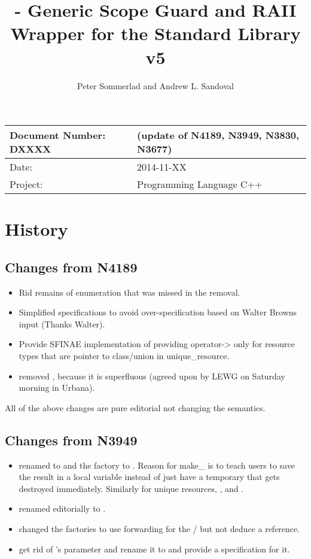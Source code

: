 \documentclass[ebook,11pt,article]{memoir}
\title{\NNumber - Generic Scope Guard and RAII Wrapper for the Standard Library v5}
\author{Peter Sommerlad and Andrew L. Sandoval}
\date{\DocDate}                                           %
\newcommand{\NNumber}[0]{DXXXX}
\newcommand{\DocDate}[0]{2014-11-XX}
\begin{document}
\maketitle
\begin{tabular}[t]{|l|l|}\hline 
Document Number: \NNumber &   (update of N4189, N3949, N3830, N3677)\\\hline
Date: & \DocDate \\\hline
Project: & Programming Language C++\\\hline 
\end{tabular}

\chapter{History}
\section{Changes from N4189}
\begin{itemize}
\item Rid remains of  enumeration that was missed in the removal.
\item Simplified specifications to avoid over-specification based on Walter Browns input (Thanks Walter).
\item Provide SFINAE implementation of providing operator-> only for resource types that are pointer to class/union in unique_resource.
\item removed , because it is superfluous (agreed upon by LEWG on Saturday morning in Urbana).
\end{itemize}
All of the above changes are pure editorial not changing the semantics.

\section{Changes from N3949}
\begin{itemize}
\item renamed  to  and the factory to . Reason for make_ is to teach users to save the result in a local variable instead of just have a temporary that gets destroyed immediately. Similarly for unique resources, ,  and .
\item renamed editorially  to .
\item changed the factories to use forwarding for the / but not deduce a reference.
\item get rid of 's parameter and rename it to  and provide a  specification for it.
\end{itemize}
\end{document}
